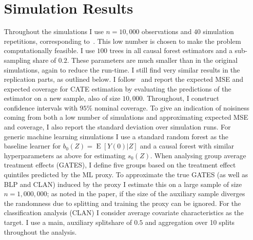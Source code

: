 \documentclass[11pt, a4paper, leqno]{article}
\DeclareMathOperator{\E}{E}
\begin{document}
\section{Simulation Results}
Throughout the simulations I use $n=10,000$ observations and $40$ simulation repetitions, corresponding to~\citet{wager2018estimation}.
This low number is chosen to make the problem computationally feasible.
I use $100$ trees in all causal forest estimators and a sub-sampling share of $0.2$.
These parameters are much smaller than in the original simulations, again to reduce the run-time.
I still find very similar results in the replication parts, as outlined below.
I follow~\citet{wager2018estimation} and report the expected MSE and expected coverage for CATE estimation by evaluating the predictions of the estimator on a new sample, also of size $10,000$.
Throughout, I construct confidence intervals with $95\%$ nominal coverage.
To give an indication of noisiness coming from both a low number of simulations and approximating expected MSE and coverage, I also report the standard deviation over simulation runs.
For generic machine learning simulations I use a standard random forest as the baseline learner for $b_0(Z) = \E[Y(0)|Z]$ and a causal forest with similar hyperparameters as above for estimating $s_0(Z)$.
When analysing group average treatment effects (GATES), I define five groups based on the treatment effect quintiles predicted by the ML proxy.
To approximate the true GATES (as well as BLP and CLAN) induced by the proxy I estimate this on a large sample of size $n=1,000,000$; as noted in the paper, if the size of the auxiliary sample diverges the randomness due to splitting and training the proxy can be ignored.
For the classification analysis (CLAN) I consider average covariate characteristics as the target. I use a main, auxiliary splitshare of $0.5$ and aggregation over 10 splits throughout the analysis.
\end{document}
